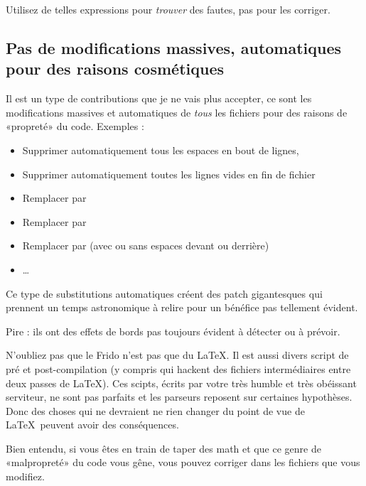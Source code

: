 Utilisez de telles expressions pour \emph{trouver} des fautes, pas pour les corriger.

\subsection{Pas de modifications massives, automatiques pour des raisons cosmétiques}

Il est un type de contributions que je ne vais plus accepter, ce sont les modifications massives et automatiques de \emph{tous} les fichiers pour des raisons de «propreté» du code. Exemples : 
\begin{itemize}
    \item Supprimer automatiquement tous les espaces en bout de lignes,
    \item Supprimer automatiquement toutes les lignes vides en fin de fichier
    \item Remplacer  par 
    \item Remplacer \info{\textbackslash [} par 
    \item Remplacer  par  (avec ou sans espaces devant ou derrière)
    \item \ldots
\end{itemize}

Ce type de substitutions automatiques créent des patch gigantesques qui prennent un temps astronomique à relire pour un bénéfice pas tellement évident.

Pire : ils ont des effets de bords pas toujours évident à détecter ou à prévoir.

N'oubliez pas que le Frido n'est pas que du \LaTeX. Il est aussi divers script de pré et post-compilation (y compris qui hackent des fichiers intermédiaires entre deux passes de \LaTeX). Ces scipts, écrits par votre très humble et très obéissant serviteur, ne sont pas parfaits et les parseurs reposent sur certaines hypothèses. Donc des choses qui ne devraient ne rien changer du point de vue de \LaTeX\ peuvent avoir des conséquences.

Bien entendu, si vous êtes en train de taper des math et que ce genre de «malpropreté» du code vous gêne, vous pouvez corriger dans les fichiers que vous modifiez.
